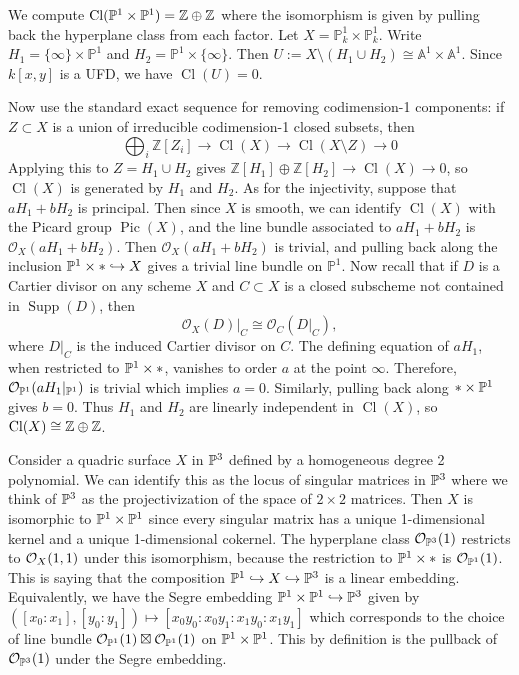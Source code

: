 \documentclass[12pt]{article}
\begin{document}
\begin{example}
    We compute $\Cl(\P^1 \times \P^1) = \Z \oplus \Z$ where the isomorphism is given by pulling back the hyperplane class from each factor. Let $X=\mathbb P^1_k\times \mathbb P^1_k$. Write $H_1=\{\infty\}\times \mathbb P^1$ and $H_2=\mathbb P^1\times \{\infty\}$. Then $U:=X\setminus (H_1\cup H_2)\cong \mathbb A^1\times \mathbb A^1$. Since $k[x,y]$ is a UFD, we have $\operatorname{Cl}(U)=0$.

    Now use the standard exact sequence for removing codimension-1 components: if $Z\subset X$ is a union of irreducible codimension-1 closed subsets, then \[\bigoplus_i \mathbb Z[Z_i]\longrightarrow \operatorname{Cl}(X)\longrightarrow \operatorname{Cl}(X\setminus Z)\longrightarrow 0\] Applying this to $Z=H_1\cup H_2$ gives $\mathbb Z[H_1]\oplus \mathbb Z[H_2]\longrightarrow \operatorname{Cl}(X)\longrightarrow 0$, so $\operatorname{Cl}(X)$ is generated by $H_1$ and $H_2$.  As for the injectivity, suppose that $aH_1+bH_2$ is principal. Then since $X$ is smooth, we can identify $\operatorname{Cl}(X)$ with the Picard group $\operatorname{Pic}(X)$, and the line bundle associated to $aH_1+bH_2$ is $\mathcal O_X(aH_1+bH_2)$. Then $\mathcal O_X(aH_1+bH_2)$ is trivial, and pulling back along the inclusion $\P^1 \times * \hookrightarrow X$ gives a trivial line bundle on $\mathbb P^1$. Now recall that if $D$ is a Cartier divisor on any scheme $X$ and $C\subset X$ is a closed subscheme not contained in $\operatorname{Supp}(D)$, then
    \[
        \mathcal O_X(D)\big|_C \cong \mathcal O_C(D|_C),
    \]
    where $D|_C$ is the induced Cartier divisor on $C$. The defining equation of $aH_1$, when restricted to $\P^1 \times *$, vanishes to order $a$ at the point $\infty$. Therefore, $\mathcal O_{\P^1}(aH_1|_{\P^1})$ is trivial which implies $a=0$. Similarly, pulling back along $*\times \P^1$ gives $b=0$. Thus $H_1$ and $H_2$ are linearly independent in $\operatorname{Cl}(X)$, so $\operatorname{Cl}(X)\cong \Z \oplus \Z$.
\end{example}

\begin{example}
    Consider a quadric surface $X$ in $\P^3$ defined by a homogeneous degree 2 polynomial. We can identify this as the locus of singular matrices in $\P^3$ where we think of $\P^3$ as the projectivization of the space of $2\times 2$ matrices. Then $X$ is isomorphic to $\P^1 \times \P^1$ since every singular matrix has a unique 1-dimensional kernel and a unique 1-dimensional cokernel. The hyperplane class $\cO_{\P^3}(1)$ restricts to $\cO_X(1,1)$ under this isomorphism, because the restriction to $\P^1 \times *$ is $\cO_{\P^1}(1)$. This is saying that the composition $\P^1 \hookrightarrow X \hookrightarrow \P^3$ is a linear embedding. Equivalently, we have the Segre embedding $\P^1 \times \P^1 \hookrightarrow \P^3$ given by $([x_0:x_1],[y_0:y_1])\mapsto [x_0y_0:x_0y_1:x_1y_0:x_1y_1]$ which corresponds to the choice of line bundle $\cO_{\P^1}(1)\boxtimes \cO_{\P^1}(1)$ on $\P^1 \times \P^1$. This by definition is the pullback of $\cO_{\P^3}(1)$ under the Segre embedding.
\end{example}
\end{document}
